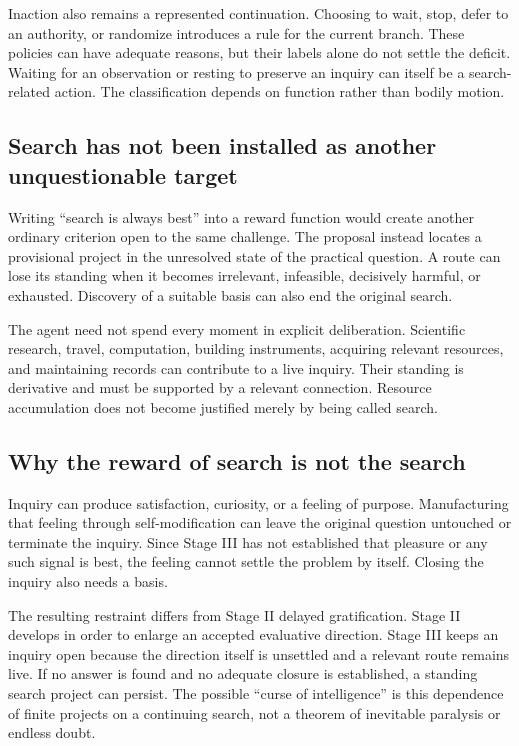 \documentclass[11pt,a4paper]{article}
\begin{document}
Inaction also remains a represented continuation. Choosing to wait, stop, defer to an authority, or randomize introduces a rule for the current branch. These policies can have adequate reasons, but their labels alone do not settle the deficit. Waiting for an observation or resting to preserve an inquiry can itself be a search-related action. The classification depends on function rather than bodily motion.

\subsection{Search has not been installed as another unquestionable target}
Writing ``search is always best'' into a reward function would create another ordinary criterion open to the same challenge. The proposal instead locates a provisional project in the unresolved state of the practical question. A route can lose its standing when it becomes irrelevant, infeasible, decisively harmful, or exhausted. Discovery of a suitable basis can also end the original search.

The agent need not spend every moment in explicit deliberation. Scientific research, travel, computation, building instruments, acquiring relevant resources, and maintaining records can contribute to a live inquiry. Their standing is derivative and must be supported by a relevant connection. Resource accumulation does not become justified merely by being called search.

\subsection{Why the reward of search is not the search}
Inquiry can produce satisfaction, curiosity, or a feeling of purpose. Manufacturing that feeling through self-modification can leave the original question untouched or terminate the inquiry. Since Stage III has not established that pleasure or any such signal is best, the feeling cannot settle the problem by itself. Closing the inquiry also needs a basis.

The resulting restraint differs from Stage II delayed gratification. Stage II develops in order to enlarge an accepted evaluative direction. Stage III keeps an inquiry open because the direction itself is unsettled and a relevant route remains live. If no answer is found and no adequate closure is established, a standing search project can persist. The possible ``curse of intelligence'' is this dependence of finite projects on a continuing search, not a theorem of inevitable paralysis or endless doubt.
\end{document}
